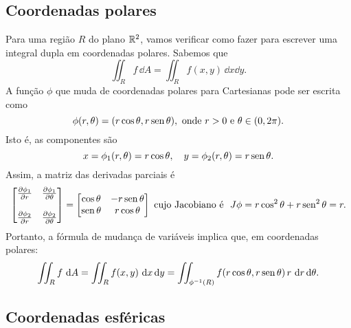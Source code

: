 \documentclass[../livro.tex]{subfiles}  %
\begin{document}
\subsection{Coordenadas polares}

Para uma região $R$ do plano $\mathbb{R}^2$, vamos verificar como fazer para escrever uma integral dupla em coordenadas polares. Sabemos que
\begin{equation}
\iint_R f \, \dd A = \iint_R f(x,y) \, \dd x \dd y.
\end{equation} A função $\phi$ que muda de coordenadas polares para Cartesianas pode ser escrita como
\begin{equation}
\phi (r, \theta) = (r\cos \theta, r \operatorname{sen} \theta), \text{ onde } r> 0 \text{ e } \theta \in (0,2\pi).
\end{equation} Isto é, as componentes são
\begin{equation}
x = \phi_1 (r, \theta) = r\cos \theta, \quad y = \phi_2 (r, \theta) = r \operatorname{sen} \theta.
\end{equation} Assim, a matriz das derivadas parciais é
\begin{equation}
\begin{bmatrix}
\frac{\partial \phi_1}{\partial r} & \frac{\partial \phi_1}{\partial \theta} \\
& \\
\frac{\partial \phi_2}{\partial r} & \frac{\partial \phi_2}{\partial \theta} \\
\end{bmatrix} = 
\begin{bmatrix}
\cos \theta & -r \operatorname{sen} \theta \\
\operatorname{sen} \theta & r \cos \theta \\
\end{bmatrix}
 \text{ cujo Jacobiano é } \ J\phi = r \cos^2 \theta + r \operatorname{sen}^2 \theta = r. 
\end{equation} Portanto, a fórmula de mudança de variáveis implica que, em coordenadas polares:
\begin{equation}
\iint_R f \, \, \mathrm{d} A = \iint_R f(x,y) \, \, \mathrm{d} x \, \mathrm{d} y = \iint_{\phi^{-1}(R)} f(r\cos \theta, r\operatorname{sen} \theta) \, r \, \, \mathrm{d} r \, \mathrm{d} \theta.
\end{equation}


\subsection{Coordenadas esféricas}
\end{document}
